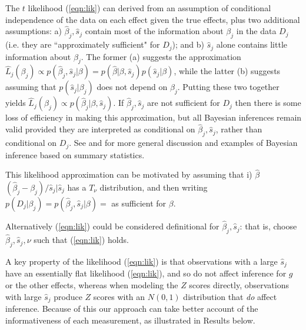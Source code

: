 \documentclass[11pt]{article}
\def\bhat{\hat{\beta}}
\def\shat{\hat{s}}
\begin{document}
The $t$ likelihood (\ref{eqn:lik}) can derived from an assumption of conditional independence of the data on each effect given the true effects, plus two additional assumptions: a) $\bhat_j, \shat_j$ contain most of the information about $\beta_j$ in the data $D_j$ (i.e. they are ``approximately sufficient" for $D_j$); and b) $\shat_j$ alone contains little information about $\beta_j$. The former (a) suggests the approximation $\hat{L}_j(\beta_j) \propto p(\bhat_j, \shat_j | \beta) = p(\bhat | \beta, \shat_j) p(\shat_j | \beta)$, while the latter (b) suggests assuming that $p(\shat_j|\beta_j)$ does not depend on $\beta_j$. Putting these two together yields $\hat{L}_j(\beta_j) \propto p(\bhat_j | \beta, \shat_j)$. If $\bhat_j, \shat_j$ are not sufficient for $D_j$ then there is some loss of efficiency in making this approximation, but all Bayesian inferences remain valid provided they are interpreted as conditional on $\bhat_j,\shat_j$, rather than conditional on $D_j$. See \cite{johnson:2008} and \cite{wakefield:2009} for more general discussion and examples of Bayesian inference based on summary statistics. 

This likelihood approximation can be motivated by assuming that i) $\bhat$
 $(\bhat_j -\beta_j)/\shat_j | \shat_j$ has a $T_\nu$ distribution, and then writing
 $p(D_j | \beta_j) = p(\bhat_j, \shat_j | \beta) = $ as sufficient for $\beta$. 
 



Alternatively (\ref{eqn:lik}) could be considered definitional for $\bhat_j,\shat_j$: that is, choose $\bhat_j,\shat_j,\nu$ such that (\ref{eqn:lik}) holds. 

A key property of the likelihood (\ref{eqn:lik}) is that
observations with a large $\shat_j$ have an essentially flat likelihood (\ref{eqn:lik}), and so do not affect inference for
$g$ or the other effects, whereas when modeling the $Z$ scores directly, observations with large $\shat_j$ produce $Z$ scores with an $N(0,1)$ distribution that {\it do} affect inference.  Because of this our approach can take better account of the informativeness of each measurement, as illustrated in Results below.

\end{document}
